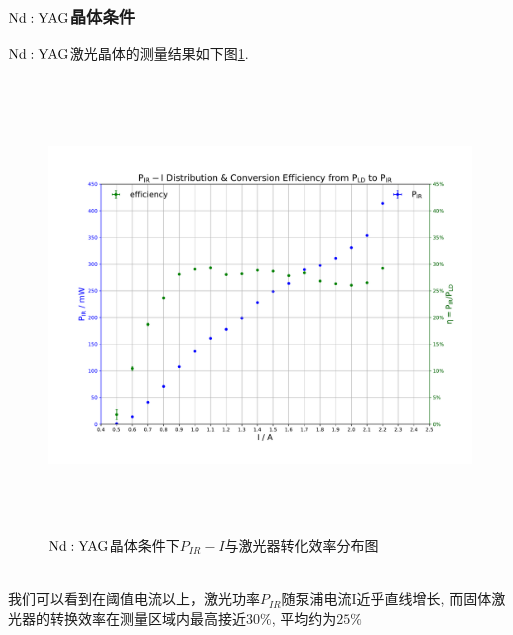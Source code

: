 \documentclass[a4paper]{article}
\begin{document}
\subsubsection{$\rm{Nd:YAG}$晶体条件}
$\rm Nd:YAG$激光晶体的测量结果如下图\ref{fig:fig3}. 
\begin{figure}[ht]
 \centering
 \includegraphics[height=12cm, width=16cm]{images/phyex3_fig.pdf}
 \caption{$\rm{Nd:YAG}$晶体条件下$P_{IR}-I$与激光器转化效率分布图}
 \label{fig:fig3}
\end{figure}\\
我们可以看到在阈值电流以上，激光功率$P_{IR}$随泵浦电流I近乎直线增长, 而固体激光器的转换效率在测量区域内最高接近$30\%$, 平均约为$25\%$

\newpage
\end{document}
